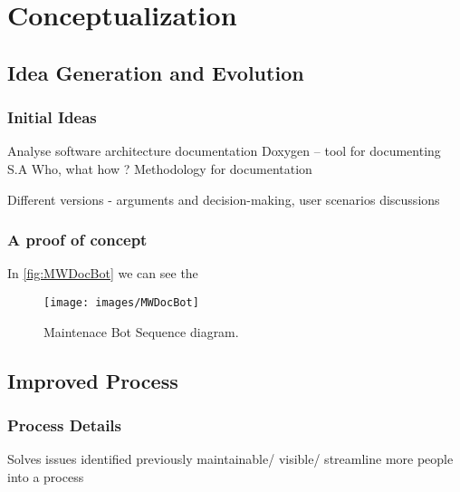 \chapter{Conceptualization}\label{chapter:Conceptualization}

\section{Idea Generation and Evolution}
\subsection{Initial Ideas}

Analyse software architecture documentation
Doxygen – tool for documenting S.A
Who, what how ?
Methodology for documentation

Different versions - arguments and decision-making, user scenarios discussions
\subsection{A proof of concept}

In \autoref{fig:MWDocBot}  we can see the 
\begin{figure}[H]
  \centering
  \texttt{[image: images/MWDocBot]}
  \caption[Maintenace Bot Sequence diagram]{Maintenace Bot Sequence diagram.}\label{fig:MWDocBot}
\end{figure}

\section{Improved Process}

\subsection{Process Details}
	Solves issues identified previously
 	maintainable/ visible/ streamline more people into a process
